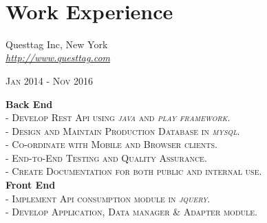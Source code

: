 \documentclass[10pt]{article} %
\begin{document}
\color{text1} %


\par{\\ %



\begin{minipage}[t]{0.5\textwidth} %
\vspace{0pt} %
	

\section{Work Experience} 

{{\raggedright\large Questtag Inc, New York  \\
\textit{\href {http://www.questtag.com}{http://www.questtag.com}}\\
}\raggedleft\textsc{Jan 2014 - Nov 2016}\\[1pt]}
\textbf{Back End}\\
	 \textsc{- Develop Rest Api using \textit{java} and \textit{play framework}.}\\
	 \textsc{- Design and Maintain Production Database in \textit{mysql}.}\\
	 \textsc{- Co-ordinate with Mobile and Browser clients.}\\
	 \textsc{- End-to-End Testing and Quality Assurance.}\\
	 \textsc{- Create Documentation for both public and internal use.}\\
\textbf{Front End}\\	
	 \textsc{- Implement Api consumption module in \textit{jquery}.}\\
	 \textsc{- Develop Application, Data manager \& Adapter module.}\\




\end{minipage}}
\end{document}
